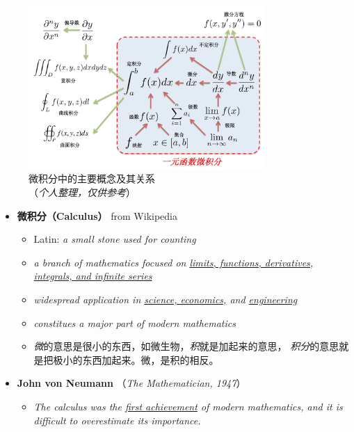 
\begin{figure}[htbp]
	\centering
	\includegraphics[width=0.8\textwidth]{./images/ch00/AM_architecture.jpg}
	\caption{微积分中的主要概念及其关系\\ （{\it 个人整理，仅供参考}）}
\end{figure}

\begin{itemize}
	  \item {\bf 微积分（Calculus）} \hfill from Wikipedia
	\begin{itemize}
	  \item Latin: {\it a small stone used for counting}  
	  \item {\it a branch of mathematics focused on \underline{limits, functions,
	  	derivatives, integrals, and infinite series}} 
  	  \item {\it widespread application in \underline{science, economics,} 
  	  and \underline{engineering}} 
	  \item {\it constitues a major part of modern mathematics}
	  \item {\it 微}的意思是很小的东西，如微生物，{\it 积}就是加起来的意思，
	  {\it 积分}的意思就是把极小的东西加起来。微，是积的相反。 
	\end{itemize}
	\item {\bf John von Neumann} （{\small\it The Mathematician, 1947}）
	\begin{itemize}
	  \item {\it The calculus was the \underline{first achievement} of modern
	  mathematics, and it is difficult to overestimate its importance.}
	\end{itemize} 
\end{itemize}

